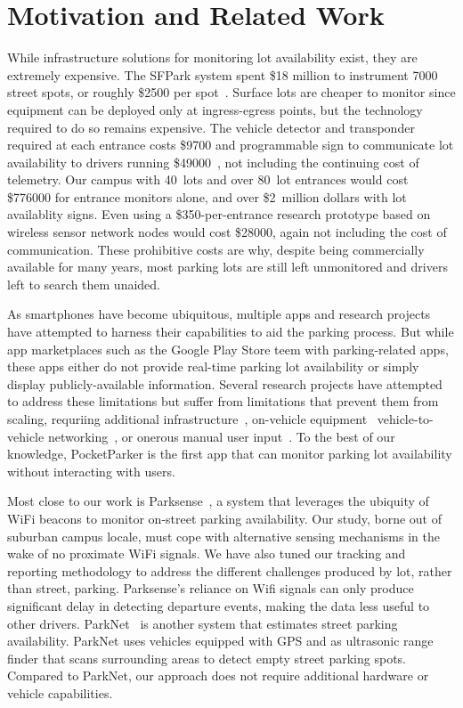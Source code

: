 \section{Motivation and Related Work}

While infrastructure solutions for monitoring lot availability exist, they
are extremely expensive. The SFPark system spent \$18 million to instrument
\num{7000} street spots, or roughly \$\num{2500} per spot~\cite{sfpark}.
Surface lots are cheaper to monitor since equipment can be deployed only at
ingress-egress points, but the technology required to do so remains
expensive. The vehicle detector and transponder required at each entrance
costs \$\num{9700} and programmable sign to communicate lot availability to
drivers running \$\num{49000}~\cite{mstp-park}, not including the continuing
cost of telemetry. Our campus with 40~lots and over 80~lot entrances would
cost \$\num{776000} for entrance monitors alone, and over \$2~million dollars
with lot availablity signs. Even using a \$\num{350}-per-entrance research
prototype based on wireless sensor network nodes would cost \$\num{28000},
again not including the cost of communication. These prohibitive costs are
why, despite being commercially available for many years, most parking lots
are still left unmonitored and drivers left to search them unaided.

As smartphones have become ubiquitous, multiple apps and research projects
have attempted to harness their capabilities to aid the parking process. But
while app marketplaces such as the Google Play Store teem with
parking-related apps, these apps either do not provide real-time parking lot
availability or simply display publicly-available information. Several
research projects have attempted to address these limitations but suffer from
limitations that prevent them from scaling, requriing additional
infrastructure~\cite{5062057}, on-vehicle equipment~\cite{Mathur:2010:PDS}
vehicle-to-vehicle networking~\cite{Delot:2009:CRP, Mathur:2010:PDS}, or
onerous manual user input~\cite{Chen:2012:COS}. To the best of our knowledge,
PocketParker is the first app that can monitor parking lot availability
without interacting with users.

Most close to our work is Parksense~\cite{Nawaz:2013:PSB}, a system that
leverages the ubiquity of WiFi beacons to monitor on-street parking
availability. Our study, borne out of suburban campus locale, must cope with
alternative sensing mechanisms in the wake of no proximate WiFi signals. We
have also tuned our tracking and reporting methodology to address the
different challenges produced by lot, rather than street, parking.
Parksense's reliance on Wifi signals can only produce significant delay in
detecting departure events, making the data less useful to other drivers.
ParkNet~\cite{Mathur:2010:PDS} is another system that estimates street
parking availability. ParkNet uses vehicles equipped with GPS and as
ultrasonic range finder that scans surrounding areas to detect empty street
parking spots. Compared to ParkNet, our approach does not require additional
hardware or vehicle capabilities.

